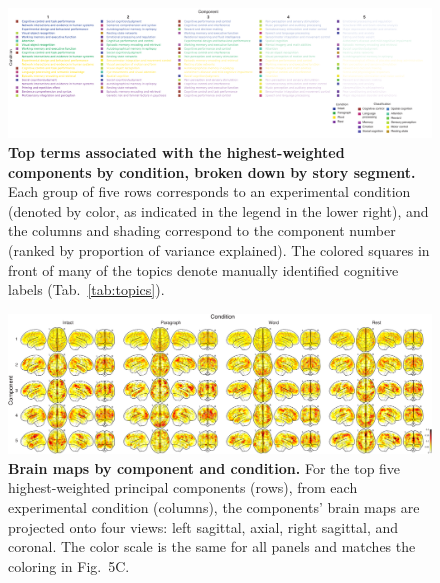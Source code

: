 \documentclass[english]{article}
\newcommand{\neurosynth}{5}
\begin{document}
\begin{figure}[t]
  \centering
  \includegraphics[width=\textwidth]{figs/top_terms_by_component}

\caption{\textbf{Top terms associated with the highest-weighted components by
condition, broken down by story segment.} Each group of five rows corresponds
to an experimental condition (denoted by color, as indicated in the legend in
the lower right), and the columns and shading correspond to the component
number (ranked by proportion of variance explained). The colored squares in
front of many of the topics denote manually identified cognitive labels
(Tab.~\ref{tab:topics}).}

\label{fig:top-terms}
\end{figure}

\begin{figure}[t]
  \centering
  \includegraphics[width=\textwidth]{figs/component_brain_maps}

\caption{\textbf{Brain maps by component and condition.} For the top five
highest-weighted principal components (rows), from each experimental condition
(columns), the components' brain maps are projected onto four views: left
sagittal, axial, right sagittal, and coronal.  The color scale is the same for all panels and matches the coloring in Fig.~\neurosynth C.}

\label{fig:components}
\end{figure}
\end{document}
